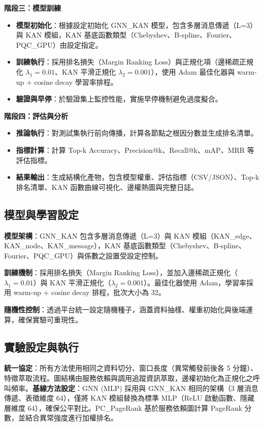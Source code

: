 \documentclass[10pt,a4paper,twocolumn]{article}
\begin{document}
\textbf{階段三：模型訓練}
\begin{itemize}
\item \textbf{模型初始化}：根據設定初始化 GNN\_KAN 模型，包含多層消息傳遞（L=3）與 KAN 模組，KAN 基底函數類型（Chebyshev、B-spline、Fourier、PQC\_GPU）由設定指定。
\item \textbf{訓練執行}：採用排名損失（Margin Ranking Loss）與正規化項（邊稀疏正規化 $\lambda_1=0.01$、KAN 平滑正規化 $\lambda_2=0.001$），使用 Adam 最佳化器與 warm-up + cosine decay 學習率排程。
\item \textbf{驗證與早停}：於驗證集上監控性能，實施早停機制避免過度擬合。
\end{itemize}

\textbf{階段四：評估與分析}
\begin{itemize}
\item \textbf{推論執行}：對測試集執行前向傳播，計算各節點之根因分數並生成排名清單。
\item \textbf{指標計算}：計算 Top-k Accuracy、Precision@k、Recall@k、mAP、MRR 等評估指標。
\item \textbf{結果輸出}：生成結構化產物，包含模型權重、評估指標（CSV/JSON）、Top-k 排名清單、KAN 函數曲線可視化、邊權熱圖與完整日誌。
\end{itemize}

\subsection{模型與學習設定}

\textbf{模型架構}：GNN\_KAN 包含多層消息傳遞（L=3）與 KAN 模組（KAN\_edge、KAN\_node、KAN\_message），KAN 基底函數類型（Chebyshev、B-spline、Fourier、PQC\_GPU）與係數之設置受設定控制。

\textbf{訓練機制}：採用排名損失（Margin Ranking Loss），並加入邊稀疏正規化（$\lambda_1=0.01$）與 KAN 平滑正規化（$\lambda_2=0.001$）。最佳化器使用 Adam，學習率採用 warm-up + cosine decay 排程，批次大小為 32。

\textbf{隨機性控制}：透過平台統一設定隨機種子，涵蓋資料抽樣、權重初始化與後端運算，確保實驗可重現性。

\subsection{實驗設定與執行}

\textbf{統一協定}：所有方法使用相同之資料切分、窗口長度（異常觸發前後各 5 分鐘）、特徵萃取流程。圖結構由服務依賴與調用追蹤資訊萃取，邊權初始化為正規化之呼叫頻率。\textbf{基線方法設定}：GNN (MLP) 採用與 GNN\_KAN 相同的架構（3 層消息傳遞、表徵維度 64），僅將 KAN 模組替換為標準 MLP（ReLU 啟動函數、隱藏層維度 64），確保公平對比。PC\_PageRank 基於服務依賴圖計算 PageRank 分數，並結合異常強度進行加權排名。
\end{document}
